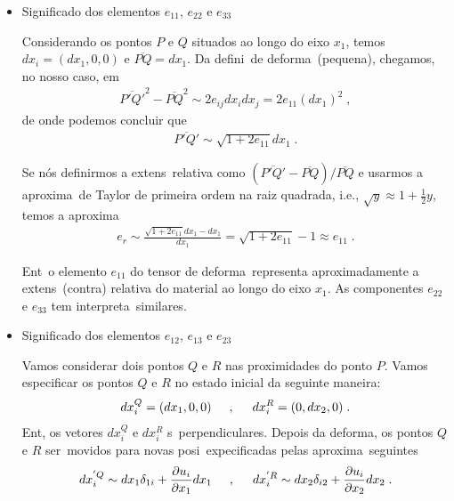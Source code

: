 \begin{itemize}
\item Significado  dos elementos $e_{11}$, $e_{22}$ e
$e_{33}$

Considerando os pontos $P$ e $Q$ situados ao longo do eixo
$x_1$, temos $dx_i = (dx_1,0,0)$ e $\overline{PQ} = dx_1$.
Da defini\cao\ de deforma\cao\ (pequena), chegamos, no
nosso caso, em
\begin{eqnarray}
\overline{P'Q'}^2 -\overline{PQ}^2 \sim 2e_{ij}dx_idx_j
= 2e_{11}(dx_1)^2 \; ,
\end{eqnarray}
de onde podemos concluir que
\begin{eqnarray}
\overline{P'Q'} \sim \sqrt{1 + 2 e_{11}} dx_1 \; .
\end{eqnarray}

Se n\'os definirmos a extens\ao\ relativa como
$(\overline{P'Q'}-\overline{PQ}) / \overline{PQ}$ e usarmos
a aproxima\cao\ de Taylor de primeira ordem na raiz quadrada, i.e.,
$\sqrt{y}\approx 1 + \frac{1}{2}y$, temos a aproxima\cao
\begin{eqnarray}
e_r \sim \frac{\sqrt{1+2 e_{11}} dx_1-dx_1}{dx_1}
= \sqrt{1+2 e_{11}} - 1 \approx e_{11} \; .
\end{eqnarray}

Ent\ao\ o elemento $e_{11}$ do tensor de deforma\cao\
representa aproximadamente a extens\ao\ (contra\cao)
relativa do material ao longo do eixo $x_1$. As
componentes $e_{22}$ e $e_{33}$ tem interpreta\coes\
similares.

\item Significado  dos elementos $e_{12}$, $e_{13}$ e
$e_{23}$

Vamos considerar dois pontos $Q$ e $R$ nas proximidades
do ponto $P$. Vamos especificar os pontos $Q$ e $R$ no
estado inicial da seguinte maneira:
\begin{eqnarray}
dx_i^{Q}=(dx_1,0,0) \hspace{0.5cm}, \hspace{0.5cm} dx_i^{R}
=(0,dx_2,0) \; .
\end{eqnarray}
Ent\ao, os vetores $dx_i^Q$ e $dx_i^R$ s\ao\ perpendiculares.
Depois da deforma\cao, os pontos $Q$ e $R$ ser\ao\ movidos
para novas posi\coes\ expecificadas pelas aproxima\coes\
seguintes
\begin{eqnarray}
dx_i^{'Q} \sim dx_1 \delta_{1i} + \frac{\partial u_i}
{\partial x_1} dx_1
\hspace{0.5cm}, \hspace{0.5cm}
dx_i^{'R} \sim dx_2 \delta_{i2} + \frac{\partial u_i}
{\partial x_2} dx_2 \; .
\end{eqnarray}


\end{itemize}
